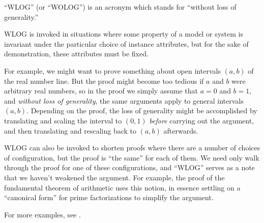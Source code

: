 \documentclass[12pt]{article}
\begin{document}
``WLOG'' (or ``WOLOG'') is an acronym which stands for ``without loss of generality.''

WLOG is invoked in situations where some property of a model or system is invariant under the particular choice of instance attributes, but for the sake of demonstration, these attributes must be fixed.

For example, we might want to prove something about open intervals $(a, b)$ of the real number line.  But the proof might become too tedious if $a$ and $b$ were arbitrary real numbers, so in the proof we simply assume that $a = 0$ and $b = 1$, and \emph{without loss of generality}, the same arguments apply to general intervals $(a, b)$.  Depending on the proof, the loss of generality might be accomplished by translating and scaling the interval to $(0,1)$ \emph{before} carrying out the argument, and then translating and rescaling back to $(a, b)$
afterwards.

WLOG can also be invoked to shorten proofs where there are a number of choices of configuration, but the proof is ``the same'' for each of them.  We need only walk through the proof for one of these configurations, and ``WLOG'' serves as a note that we haven't weakened the argument.  For example, the proof of the fundamental theorem of arithmetic uses this notion, in essence settling on a ``canonical form'' for prime factorizations to simplify the argument.

For more examples, see .
\end{document}
